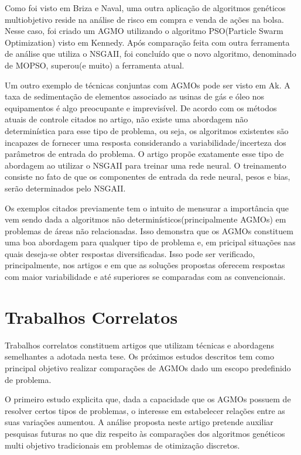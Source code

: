 \documentclass[12pt, %
openright, 
oneside, %
a4paper,    %
brazil]{facom-ufu-abntex2}
\begin{document}
    Como foi visto em  Briza e Naval\cite{stockMOPSO}, uma outra aplicação de algoritmos genéticos multiobjetivo reside na análise de risco em compra e venda de ações na bolsa. Nesse caso, foi criado um AGMO utilizando o algoritmo PSO(Particle Swarm Optimization) visto em Kennedy\cite{PSO}. Após comparação feita com outra ferramenta de análise que utiliza o NSGAII, foi concluído que o novo algoritmo, denominado de MOPSO, superou(e muito) a ferramenta atual.
	
    Um outro exemplo de técnicas conjuntas com AGMOs pode ser visto em  Ak\cite{SoilGasPlantDepositionNSGAII}. A taxa de sedimentação de elementos associado as usinas de gás e óleo nos equipamentos é algo preocupante e imprevisível. De acordo com os métodos atuais de controle citados no artigo, não existe uma abordagem não determinística para esse tipo de problema, ou seja, os algoritmos existentes são incapazes de fornecer uma resposta considerando a variabilidade/incerteza dos parâmetros de entrada do problema. O artigo propõe exatamente esse tipo de abordagem ao utilizar o NSGAII para treinar uma rede neural. O treinamento consiste no fato de que os componentes de entrada da rede neural, pesos e bias, serão determinados pelo NSGAII.
    
    Os exemplos citados previamente tem o intuito de mensurar a importância que vem sendo dada a algoritmos não determinísticos(principalmente AGMOs) em problemas de áreas não relacionadas. Isso demonstra que os AGMOs constituem uma boa abordagem para qualquer tipo de problema e, em pricipal situações nas quais deseja-se obter respostas diversificadas. Isso pode ser verificado, principalmente, nos artigos \cite{stockMOPSO} e \cite{SoilGasPlantDepositionNSGAII} em que as soluções propostas oferecem respostas com maior variabilidade e até superiores se comparadas com as convencionais.
    
\chapter*[Trabalhos Correlatos]{Trabalhos Correlatos}

	Trabalhos correlatos constituem artigos que utilizam técnicas e abordagens semelhantes a adotada nesta tese. Os próximos estudos descritos tem como principal objetivo realizar comparações de AGMOs dado um escopo predefinido de problema.
	 
	O primeiro estudo explicita que, dada a capacidade que os AGMOs possuem de resolver certos tipos de problemas, o interesse em estabelecer relações entre as suas variações aumentou. A análise proposta neste artigo pretende auxiliar pesquisas futuras no que diz respeito às comparações dos algoritmos genéticos multi objetivo tradicionais em problemas de otimização discretos.
	
\end{document}
